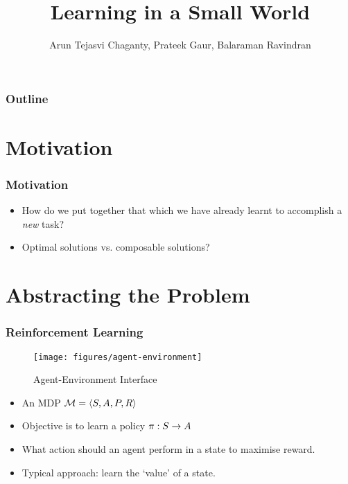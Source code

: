 \documentclass{beamer}
\title{Learning in a Small World}
\author{Arun Tejasvi Chaganty, Prateek Gaur, Balaraman Ravindran}
\begin{document}
\begin{frame}
\titlepage
\end{frame}

\begin{frame}
\frametitle{Outline} %
\tableofcontents  %
\end{frame}

\section{Motivation}
\label{sec:motivation}

\begin{frame}
    \frametitle{Motivation}
    \label{frame:motivation}
    
    \begin{itemize}
            \item How do we put together that which we have already learnt to accomplish a {\em new} task?
            \pause 
            \item Optimal solutions vs. composable solutions?
    \end{itemize}

\end{frame}

\section{Abstracting the Problem}
\label{sec:abstraction}

\begin{frame}
    \frametitle{Reinforcement Learning}
    \label{frame:abstraction-rl}

    \begin{figure}[h]
        \centering
        \texttt{[image: figures/agent-environment]}
        \label{fig:agent-environment}
        \caption{Agent-Environment Interface}
    \end{figure}

    \begin{itemize}
            \item An MDP $\mathcal{M} = \langle  S, A, P, R  \rangle$
            \item Objective is to learn a policy $\pi : S \to A$
            \item What action should an agent perform in a state to maximise
                reward.
            \item Typical approach: learn the `value' of a state.
    \end{itemize}
\end{frame}
\end{document}
